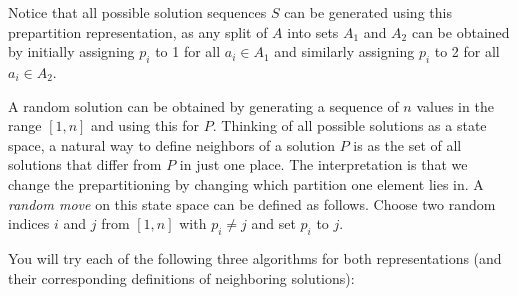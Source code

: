 \documentclass[11pt]{article}
\begin{document}
Notice that all possible solution sequences $S$ can be generated using this prepartition representation, as any split of $A$ into
sets $A_1$ and $A_2$ can be obtained by initially assigning 
$p_i$ to 1 for all $a_i \in A_1$ and similarly assigning 
$p_i$ to 2 for all $a_i \in A_2$.

A random solution can be obtained by generating a sequence of $n$
values in the range $[1,n]$ and using this for $P$.  Thinking of all
possible solutions as a state space, a natural way to define neighbors
of a solution $P$ is as the set of all solutions that differ from $P$
in just one place.  The interpretation is that we change the
prepartitioning by changing which partition one element lies in.
A {\em random move} on this state space can be defined as follows.
Choose two random indices $i$ and $j$ from $[1,n]$ with $p_i
\neq j$ and set $p_i$ to $j$.

You will try each of the following three algorithms for both
representations (and their corresponding definitions of neighboring solutions):
\end{document}
